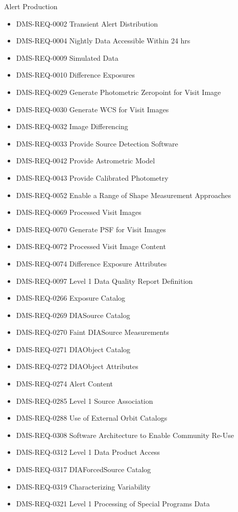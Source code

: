 Alert Production \begin{itemize}
\item DMS-REQ-0002 Transient Alert Distribution
\item DMS-REQ-0004 Nightly Data Accessible Within 24 hrs
\item DMS-REQ-0009 Simulated Data
\item DMS-REQ-0010 Difference Exposures
\item DMS-REQ-0029 Generate Photometric Zeropoint for Visit Image
\item DMS-REQ-0030 Generate WCS for Visit Images
\item DMS-REQ-0032 Image Differencing
\item DMS-REQ-0033 Provide Source Detection Software
\item DMS-REQ-0042 Provide Astrometric Model
\item DMS-REQ-0043 Provide Calibrated Photometry
\item DMS-REQ-0052 Enable a Range of Shape Measurement Approaches
\item DMS-REQ-0069 Processed Visit Images
\item DMS-REQ-0070 Generate PSF for Visit Images
\item DMS-REQ-0072 Processed Visit Image Content
\item DMS-REQ-0074 Difference Exposure Attributes
\item DMS-REQ-0097 Level 1 Data Quality Report Definition
\item DMS-REQ-0266 Exposure Catalog
\item DMS-REQ-0269 DIASource Catalog
\item DMS-REQ-0270 Faint DIASource Measurements
\item DMS-REQ-0271 DIAObject Catalog
\item DMS-REQ-0272 DIAObject Attributes
\item DMS-REQ-0274 Alert Content
\item DMS-REQ-0285 Level 1 Source Association
\item DMS-REQ-0288 Use of External Orbit Catalogs
\item DMS-REQ-0308 Software Architecture to Enable Community Re-Use
\item DMS-REQ-0312 Level 1 Data Product Access
\item DMS-REQ-0317 DIAForcedSource Catalog
\item DMS-REQ-0319 Characterizing Variability
\item DMS-REQ-0321 Level 1 Processing of Special Programs Data

\end{itemize}
